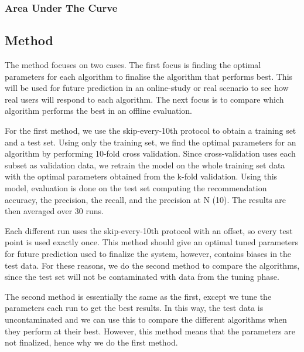 \subsubsection{Area Under The Curve}


\subsection{Method} \label{Method}


The method focuses on two cases. The first focus is finding the optimal parameters for each algorithm to finalise the algorithm that performs best. This will be used for future prediction in an online-study or real scenario to see how real users will respond to each algorithm. The next focus is to compare which algorithm performs the best in an offline evaluation.

For the first method, we use the skip-every-10th protocol to obtain a training set and a test set. Using only the training set, we find the optimal parameters for an algorithm by performing 10-fold cross validation. Since cross-validation uses each subset as validation data, we retrain the model on the whole training set data with the optimal parameters obtained from the k-fold validation. Using this model, evaluation is done on the test set computing the recommendation accuracy, the precision, the recall, and the precision at N (10). The results are then averaged over 30 runs. 

 Each different run uses the skip-every-10th protocol with an offset, so every test point is used exactly once. This method should give an optimal tuned parameters for future prediction used to finalize the system, however, contains biases in the test data. For these reasons, we do the second method to compare the algorithms, since the test set will not be contaminated with data from the tuning phase.

The second method is essentially the same as the first, except we tune the parameters each run to get the best results. In this way, the test data is uncontaminated and we can use this to compare the different algorithms when they perform at their best. However, this method means that the parameters are not finalized, hence why we do the first method. 


